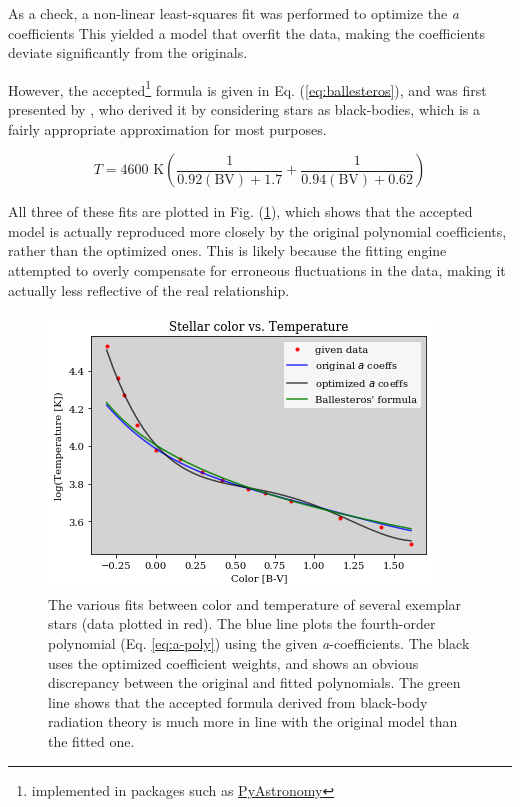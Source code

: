 \documentclass[twocolumn]{aastex63}
\begin{document}
As a check, a non-linear least-squares fit was performed to optimize the \emph{a} coefficients This yielded a model that overfit the data, making the coefficients deviate significantly from the originals.

However, the accepted\footnote{implemented in packages such as \href{https://github.com/sczesla/PyAstronomy}{PyAstronomy}} formula is given in Eq. (\ref{eq:ballesteros}), and was first presented by \citet{Ballesteros_2012}, who derived it by considering stars as black-bodies, which is a fairly appropriate approximation for most purposes. 

\begin{equation} \label{eq:ballesteros}
  T = 4600\text{ K}(\frac{1}{0.92(\text{BV})+1.7}+\frac{1}{0.94(\text{BV})+0.62})
\end{equation}

All three of these fits are plotted in Fig. (\ref{fig:colortemp}), which shows that the accepted model is actually reproduced more closely by the original polynomial coefficients, rather than the optimized ones. This is likely because the fitting engine attempted to overly compensate for erroneous fluctuations in the data, making it actually less reflective of the real relationship.

\begin{figure}[!h]
\centering
\includegraphics[width=\linewidth]{colortemps.png}
\caption{The various fits between color and temperature of several exemplar stars (data plotted in red). The blue line plots the fourth-order polynomial (Eq. \ref{eq:a-poly}) using the given \emph{a}-coefficients. The black uses the optimized coefficient weights, and shows an obvious discrepancy between the original and fitted polynomials. The green line shows that the accepted formula derived from black-body radiation theory is much more in line with the original model than the fitted one.
\label{fig:colortemp}}
\end{figure}
\end{document}
